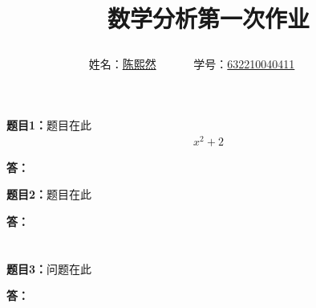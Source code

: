 \documentclass[12pt,a4paper]{article}
\begin{document}
\title{
{\heiti\fontsize{35pt}{10pt} 数学分析第一次作业

}
}
\date{}

\author{
姓名：\underline{陈熙然}~~~~~~
学号：\underline{632210040411}~~~~~~}

\maketitle

\noindent
\section*{\heiti \color{red}{知识点:}}
\noindent
{\bf 题目1：}题目在此
\begin{align}
x^2+2
\end{align}


\vspace{5pt}
\noindent
{\bf 答：}

\vspace{10pt}
\noindent
{\bf 题目2：}题目在此

\vspace{5pt}
\noindent
{\bf 答：}
\noindent
\section*{\heiti \color{red}{知识点:}}
\vspace{10pt}
\noindent
{\bf 题目3：}问题在此



\vspace{5pt}
\noindent
{\bf 答：}
\end{document}
